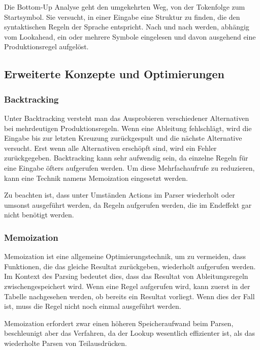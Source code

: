 Die Bottom-Up Analyse geht den umgekehrten Weg, von der Tokenfolge zum Startsymbol. Sie versucht, in einer Eingabe eine Struktur zu finden, die den syntaktischen Regeln der Sprache entspricht. Nach und nach werden, abhängig vom Lookahead, ein oder mehrere Symbole eingelesen und davon ausgehend eine Produktionsregel aufgelöst.


\subsection{Erweiterte Konzepte und Optimierungen}
\label{theorie_erweiterte_konzepte}

\subsubsection{Backtracking} 

Unter Backtracking versteht man das Ausprobieren verschiedener Alternativen bei mehrdeutigen Produktionsregeln. Wenn eine Ableitung fehlschlägt, wird die Eingabe bis zur letzten Kreuzung zurückgespult und die nächste Alternative versucht. Erst wenn alle Alternativen erschöpft sind, wird ein Fehler zurückgegeben. Backtracking kann sehr aufwendig sein, da einzelne Regeln für eine Eingabe öfters aufgerufen werden. Um diese Mehrfachaufrufe zu reduzieren, kann eine Technik namens Memoization eingesetzt werden.

Zu beachten ist, dass unter Umständen Actions im Parser wiederholt oder umsonst ausgeführt werden, da Regeln aufgerufen werden, die im Endeffekt gar nicht benötigt werden.

\subsubsection{Memoization}

Memoization ist eine allgemeine Optimierungstechnik, um zu vermeiden, dass Funktionen, die das gleiche Resultat zurückgeben,  wiederholt aufgerufen werden. Im Kontext des Parsing bedeutet dies, dass das Resultat von Ab\-lei\-tungs\-re\-geln zwischengespeichert wird. Wenn eine Regel aufgerufen wird, kann zuerst in der Tabelle nachgesehen werden, ob bereits ein Resultat vorliegt. Wenn dies der Fall ist, muss die Regel nicht noch einmal ausgeführt werden.

Memoization erfordert zwar einen höheren Speicheraufwand beim Parsen, beschleunigt aber das Verfahren, da der Lookup wesentlich effizienter ist, als das wiederholte Parsen von Teilausdrücken.

